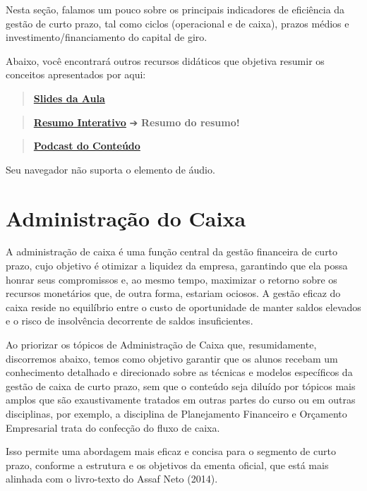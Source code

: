 \documentclass[
  a4paper,
]{book}
\begin{document}

Nesta seção, falamos um pouco sobre os principais indicadores de
eficiência da gestão de curto prazo, tal como ciclos (operacional e de
caixa), prazos médios e investimento/financiamento do capital de giro.

Abaixo, você encontrará outros recursos didáticos que objetiva resumir
os conceitos apresentados por aqui:

\begin{quote}
\href{./resources/giro-ppt.html}{\textbf{Slides da Aula}}
\end{quote}

\begin{quote}
\href{./resources/giro-interativo.html}{\textbf{Resumo Interativo}} ➔
\textbf{Resumo do resumo!} 🥱
\end{quote}

\begin{quote}
\href{resources/giro-podcast.mp3}{\textbf{Podcast do Conteúdo}}
\end{quote}

Seu navegador não suporta o elemento de áudio.


\chapter{Administração do Caixa}\label{sec-caixa}

A administração de caixa é uma função central da gestão financeira de
curto prazo, cujo objetivo é otimizar a liquidez da empresa, garantindo
que ela possa honrar seus compromissos e, ao mesmo tempo, maximizar o
retorno sobre os recursos monetários que, de outra forma, estariam
ociosos. A gestão eficaz do caixa reside no equilíbrio entre o custo de
oportunidade de manter saldos elevados e o risco de insolvência
decorrente de saldos insuficientes.

Ao priorizar os tópicos de Administração de Caixa que, resumidamente,
discorremos abaixo, temos como objetivo garantir que os alunos recebam
um conhecimento detalhado e direcionado sobre as técnicas e modelos
específicos da gestão de caixa de curto prazo, sem que o conteúdo seja
diluído por tópicos mais amplos que são exaustivamente tratados em
outras partes do curso ou em outras disciplinas, por exemplo, a
disciplina de Planejamento Financeiro e Orçamento Empresarial trata do
confecção do fluxo de caixa.

Isso permite uma abordagem mais eficaz e concisa para o segmento de
curto prazo, conforme a estrutura e os objetivos da ementa oficial, que
está mais alinhada com o livro-texto do Assaf Neto (2014).
\end{document}
